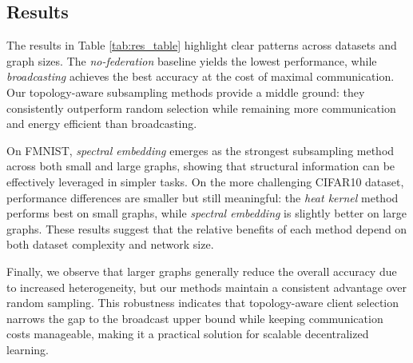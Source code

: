 \documentclass[journal]{IEEEtran}
\begin{document}
\subsection{Results} 
\label{sec:res}
The results in Table \ref{tab:res_table} highlight clear patterns across datasets and graph sizes. The \textit{no-federation} baseline yields the lowest performance, while \textit{broadcasting} achieves the best accuracy at the cost of maximal communication. Our topology-aware subsampling methods provide a middle ground: they consistently outperform random selection while remaining more communication and energy efficient than broadcasting.

On FMNIST, \textit{spectral embedding} emerges as the strongest subsampling method across both small and large graphs, showing that structural information can be effectively leveraged in simpler tasks. On the more challenging CIFAR10 dataset, performance differences are smaller but still meaningful: the \textit{heat kernel} method performs best on small graphs, while \textit{spectral embedding} is slightly better on large graphs. These results suggest that the relative benefits of each method depend on both dataset complexity and network size.

Finally, we observe that larger graphs generally reduce the overall accuracy due to increased heterogeneity, but our methods maintain a consistent advantage over random sampling. This robustness indicates that topology-aware client selection narrows the gap to the broadcast upper bound while keeping communication costs manageable, making it a practical solution for scalable decentralized learning.
\end{document}

